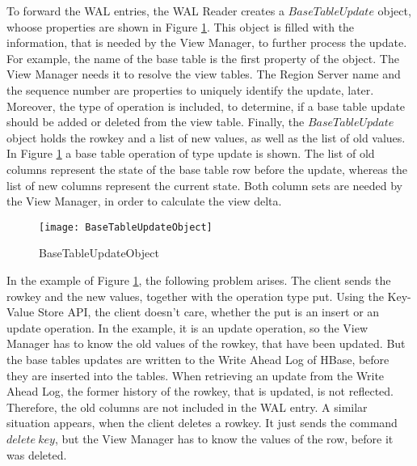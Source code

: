 \documentclass[11pt,a4paper,bibtotoc,idxtotoc,headsepline,footsepline,footexclude,BCOR12mm,DIV13]{scrbook}
\begin{document}
To forward the WAL entries, the WAL Reader creates a $BaseTableUpdate$ object, whoose properties are shown in Figure \ref{fig:basetableupdateobject}. This object is filled with the information, that is needed by the View Manager, to further process the update. For example, the name of the base table is the first property of the object. The View Manager needs it to resolve the view tables. The Region Server name and the sequence number are properties to uniquely identify the update, later. Moreover, the type of operation is included, to determine, if a base table update should be added or deleted from the view table. Finally, the $BaseTableUpdate$ object holds the rowkey and a list of new values, as well as the list of old values. In Figure \ref{fig:basetableupdateobject} a base table operation of type update is shown. The list of old columns represent the state of the base table row before the update, whereas the list of new columns represent the current state. Both column sets are needed by the View Manager, in order to calculate the view delta.

\begin{figure}[h!]
  
  \centering
    \texttt{[image: BaseTableUpdateObject]}
    \caption{BaseTableUpdateObject}
    \label{fig:basetableupdateobject}
\end{figure}



In the example of Figure \ref{fig:basetableupdateobject}, the following problem arises. The client sends the rowkey and the new values, together with the operation type put. Using the Key-Value Store API, the client doesn't care, whether the put is an insert or an update operation. In the example, it is an update operation, so the View Manager has to know the old values of the rowkey, that have been updated. But the base tables updates are written to the Write Ahead Log of HBase, before they are inserted into the tables. When retrieving an update from the Write Ahead Log, the former history of the rowkey, that is updated, is not reflected. Therefore, the old columns are not included in the WAL entry. A similar situation appears, when the client deletes a rowkey. It just sends the command $delete\:key$, but the View Manager has to know the values of the row, before it was deleted.
\end{document}
